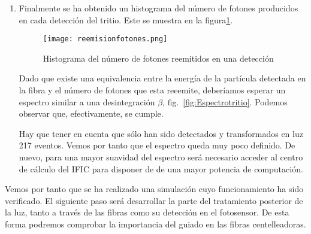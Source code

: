 \begin{enumerate}
\item{} Finalmente se ha obtenido un histograma del número de fotones producidos en cada detección del tritio. Este se muestra en la figura\ref{reemision}.

\begin{figure}[hbtp]
\centering
\texttt{[image: reemisionfotones.png]}
\caption{Histograma del número de fotones reemitidos en una detección \label{reemision}}
\end{figure}

Dado que existe una equivalencia entre la energía de la partícula detectada en la fibra y el número de fotones que esta reeemite, deberíamos esperar un espectro similar a una desintegración $\beta$, fig.~\ref{fig:Espectrotritio}. Podemos observar que, efectivamente, se cumple.

Hay que tener en cuenta que sólo han sido detectados y transformados en luz 217 eventos. Vemos por tanto que el espectro queda muy poco definido. De nuevo, para una mayor suavidad del espectro será necesario acceder al centro de cálculo del IFIC para disponer de de una mayor potencia de computación.
\end{enumerate}

Vemos por tanto que se ha realizado una simulación cuyo funcionamiento ha sido verificado. El siguiente paso será desarrollar la parte del tratamiento posterior de la luz, tanto a través de las fibras como su detección en el fotosensor. De esta forma podremos comprobar la importancia del guiado en las fibras centelleadoras.